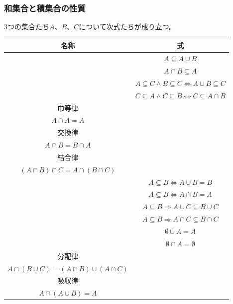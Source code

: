 \documentclass[a4paper]{jsarticle}
\begin{document}
\subsubsection{和集合と積集合の性質}%
\begin{thm}
\label{1.2.2.1}
3つの集合たち$A$、$B$、$C$について次式たちが成り立つ。
\begin{longtable}[c]{|c|c|}
\hline
名称 & 式 \\
\hline \hline
& $A \subseteq A \cup B$ \\
& $A \cap B \subseteq A$ \\
\hline
& $A \subseteq C \land B \subseteq C \Leftrightarrow A \cup B \subseteq C$ \\
& $C \subseteq A \land C \subseteq B \Leftrightarrow C \subseteq A \cap B$ \\
\hline
巾等律 & \hspace{-0.5em}\begin{tabular}{c}
  $A \cup A = A$ \\
  $A \cap A = A$ 
\end{tabular}\\
\hline
交換律 & \hspace{-0.5em}\begin{tabular}{c}
  $A \cup B = B \cup A$ \\
  $A \cap B = B \cap A$ 
\end{tabular}\\
\hline
結合律 & \hspace{-0.5em}\begin{tabular}{c}
  $(A \cup B) \cup C = A \cup (B \cup C) $\\
  $(A \cap B) \cap C = A \cap (B \cap C)$ 
\end{tabular}\\
\hline
& $A \subseteq B \Leftrightarrow A \cup B = B $\\
& $A \subseteq B \Leftrightarrow A \cap B = A$ \\
\hline
& $A \subseteq B \Rightarrow A \cup C \subseteq B \cup C$ \\
& $A \subseteq B \Rightarrow A \cap C \subseteq B \cap C$ \\
\hline
& $\emptyset \cup A = A$ \\
& $\emptyset \cap A = \emptyset$ \\
\hline
分配律 & \hspace{-0.5em}\begin{tabular}{c}
  $A \cup (B \cap C) = (A \cup B) \cap (A \cup C) $\\
  $A \cap (B \cup C) = (A \cap B) \cup (A \cap C)$ 
\end{tabular}\\
\hline
吸収律 & \hspace{-0.5em}\begin{tabular}{c}
  $A \cup (A \cap B) = A$\\
  $A \cap (A \cup B) = A$ 
\end{tabular}\\
\hline
\end{longtable}
\end{thm}
\end{document}

